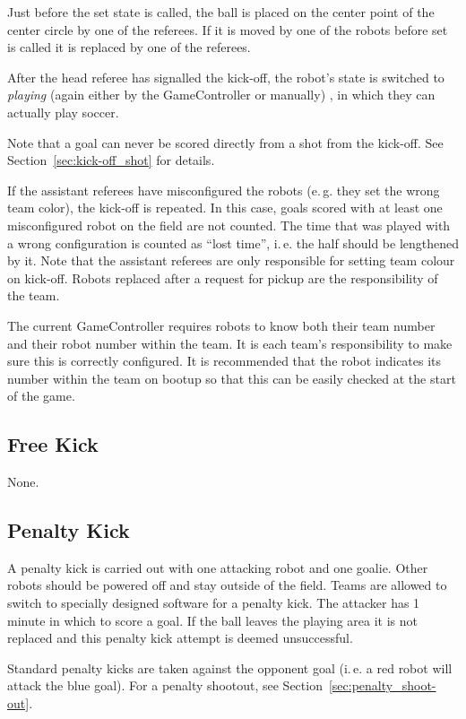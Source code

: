 \documentclass[12pt]{article}
\newcommand{\ie}{\mbox{i.\,e.}\xspace}
\newcommand{\eg}{\mbox{e.\,g.}\xspace}
\begin{document}
Just before the set state is called, the ball is placed on the
center point of the center circle by one of the referees.  If it
is moved by one of the robots before set is called it is replaced
by one of the referees.

After the head referee has signalled the kick-off, the robot's state
is switched to \emph{playing} (again either by the GameController or manually)
, in which they can actually play soccer.

Note that a goal can never be scored directly from a shot from the
kick-off. See Section~\ref{sec:kick-off_shot} for details.

If the assistant referees have misconfigured the robots (\eg they
set the wrong team color), the kick-off is repeated. In this case,
goals scored with at least one misconfigured robot on the field are
not counted. The time that was played with a wrong configuration is
counted as ``lost time'', \ie the half should be lengthened by it.
Note that the assistant referees are only responsible for setting team
colour on kick-off.  Robots replaced after a request for pickup are
the responsibility of the team.

The current GameController requires robots to know both their team number
and their robot number within the team.  It is each team's responsibility
to make sure this is correctly configured.  It is recommended that the
robot indicates its number within the team on bootup so that this can
be easily checked at the start of the game. %

\subsection{Free Kick}
None.

\subsection{Penalty Kick}
\label{sec:penalty_kick}

A penalty kick is carried out with one attacking robot and one
goalie.  Other robots should be powered off and stay outside of the
field. Teams are allowed to switch to specially designed software
for a penalty kick.  The attacker has 1 minute in which to score a
goal. If the ball leaves the playing area it is not replaced and
this penalty kick attempt is deemed unsuccessful.

Standard penalty kicks are taken against the opponent goal (\ie a
red robot will attack the blue goal).  For a penalty shootout, see
Section~\ref{sec:penalty_shoot-out}.
\end{document}
